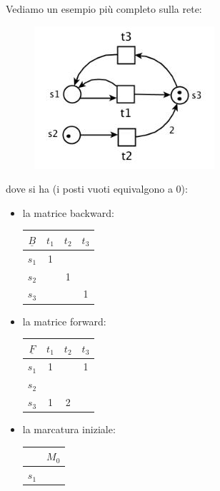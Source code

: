 \documentclass[a4paper,12pt, oneside]{book}
\begin{document}
\begin{esempio}
  Vediamo un esempio più completo sulla rete:
  \begin{figure}[H]
    \centering
    \includegraphics[scale = 0.7]{img/al2.jpg}
  \end{figure}
  dove si ha (i posti vuoti equivalgono a 0):
  \begin{itemize}
    \item la matrice backward:
    \begin{center}
      \begin{tabular}{|c|c|c|c|}
        \hline
        $\underline{B}$ & $t_1$ & $t_2$ & $t_3$ \\
        \hline 
        $s_1$ & 1 & & \\
        \hline
        $s_2$ & & 1 & \\
        \hline
        $s_3$ & & & 1 \\
        \hline
      \end{tabular}
    \end{center}
    \item la matrice forward:
    \begin{center}
      \begin{tabular}{|c|c|c|c|}
        \hline
        $\underline{F}$ & $t_1$ & $t_2$ & $t_3$ \\
        \hline 
        $s_1$ & 1 & & 1 \\
        \hline
        $s_2$ & &  & \\
        \hline
        $s_3$ & 1 & 2 & \\
        \hline
      \end{tabular}
    \end{center}
    \item la marcatura iniziale:
    \begin{center}
      \begin{tabular}{|c|c|}
        \hline
        & $M_0$\\
        \hline
        $s_1$ & \\

\end{tabular}
\end{center}
\end{itemize}
\end{esempio}
\end{document}
